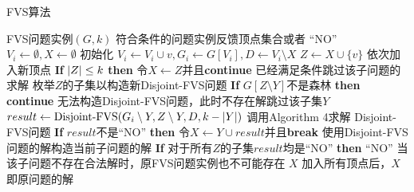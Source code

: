 \begin{algorithm}
\caption{FVS算法}
\begin{algorithmic}[1]
\Require FVS问题实例$(G,k)$
\Ensure  符合条件的问题实例反馈顶点集合或者 “NO”
\algrule
{}
    \State $V_i \gets \emptyset, X \gets \emptyset$
    \State \Comment 初始化
        \State $V_i \gets V_i \cup v, G_i \gets G[V_i], D \gets V_i \setminus X$        
        \State $Z \gets X \cup \{v\}$
        \State \Comment 依次加入新顶点
        \State \textbf{If} $\left\vert Z \right\vert \le k$ \textbf{then} 令$X \gets Z$并且\textbf{continue}
        \State \Comment 已经满足条件跳过该子问题的求解
            \State \Comment 枚举$Z$的子集以构造新Disjoint-FVS问题
            \State \textbf{If} $G[Z \setminus Y]$不是森林 \textbf{then} \textbf{continue}
            \State \Comment 无法构造Disjoint-FVS问题，此时不存在解跳过该子集$Y$
            \State $result \gets \text{Disjoint-FVS}(G_i \setminus Y, Z \setminus Y, D, k - \left\vert Y \right\vert)$
            \State \Comment 调用Algorithm 4求解 Disjoint-FVS问题
            \State \textbf{If} $result$不是“NO” \textbf{then} 令$X \gets Y \cup result$并且\textbf{break}
            \State \Comment 使用Disjoint-FVS问题的解构造当前子问题的解
        \EndFor
        \State \textbf{If} 对于所有$Z$的子集$result$均是“NO” \textbf{then} \Return “NO”
        \State \Comment 当该子问题不存在合法解时，原FVS问题实例也不可能存在
    \EndFor
    \State \Return $X$
    \State \Comment 加入所有顶点后，$X$即原问题的解
\EndFunction
\end{algorithmic}
\end{algorithm}

